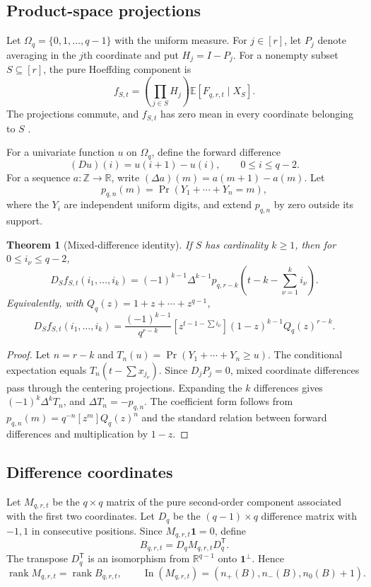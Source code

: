 \documentclass[11pt]{amsart}
\newcommand{\R}{\mathbb R}
\newcommand{\Z}{\mathbb Z}
\newcommand{\In}{\operatorname{In}}
\newcommand{\rank}{\operatorname{rank}}
\newcommand{\1}{\mathbf 1}
\newtheorem{theorem}{Theorem}[section]
\theoremstyle{remark}
\begin{document}
\subsection{Product-space projections}
Let $\Omega_q=\{0,1,\ldots,q-1\}$ with the uniform measure. For $j\in[r]$, let $P_j$ denote averaging in the $j$th coordinate and put $H_j=I-P_j$. For a nonempty subset $S\subseteq[r]$, the pure Hoeffding component is
\[
 f_{S,t}=\left(\prod_{j\in S}H_j\right)\mathbb E[F_{q,r,t}\mid X_S].
\]
The projections commute, and $f_{S,t}$ has zero mean in every coordinate belonging to $S$ \cite{Hoeffding}.

For a univariate function $u$ on $\Omega_q$, define the forward difference
\[
 (Du)(i)=u(i+1)-u(i),\qquad 0\le i\le q-2.
\]
For a sequence $a:\Z\to\R$, write $(\Delta a)(m)=a(m+1)-a(m)$. Let
\[
 p_{q,n}(m)=\Pr(Y_1+\cdots+Y_n=m),
\]
where the $Y_i$ are independent uniform digits, and extend $p_{q,n}$ by zero outside its support.

\begin{theorem}[Mixed-difference identity]\label{thm:mixed-difference}
If $S$ has cardinality $k\ge1$, then for $0\le i_\nu\le q-2$,
\[
 D_Sf_{S,t}(i_1,\ldots,i_k)
 =(-1)^{k-1}\Delta^{k-1}p_{q,r-k}
 \left(t-k-\sum_{\nu=1}^ki_\nu\right).
\]
Equivalently, with $Q_q(z)=1+z+\cdots+z^{q-1}$,
\[
 D_Sf_{S,t}(i_1,\ldots,i_k)
 =\frac{(-1)^{k-1}}{q^{r-k}}
 [z^{t-1-\sum i_\nu}](1-z)^{k-1}Q_q(z)^{r-k}.
\]
\end{theorem}

\begin{proof}
Let $n=r-k$ and $T_n(u)=\Pr(Y_1+\cdots+Y_n\ge u)$. The conditional expectation equals $T_n(t-\sum x_{j_\nu})$. Since $D_jP_j=0$, mixed coordinate differences pass through the centering projections. Expanding the $k$ differences gives $(-1)^k\Delta^kT_n$, and $\Delta T_n=-p_{q,n}$. The coefficient form follows from $p_{q,n}(m)=q^{-n}[z^m]Q_q(z)^n$ and the standard relation between forward differences and multiplication by $1-z$.
\end{proof}

\subsection{Difference coordinates}
Let $M_{q,r,t}$ be the $q\times q$ matrix of the pure second-order component associated with the first two coordinates. Let $D_q$ be the $(q-1)\times q$ difference matrix with $-1,1$ in consecutive positions. Since $M_{q,r,t}\1=0$, define
\[
 B_{q,r,t}=D_qM_{q,r,t}D_q^{\mathsf T}.
\]
The transpose $D_q^{\mathsf T}$ is an isomorphism from $\R^{q-1}$ onto $\1^\perp$. Hence
\begin{equation}\label{eq:inertia-transfer}
 \rank M_{q,r,t}=\rank B_{q,r,t},\qquad
 \In(M_{q,r,t})=(n_+(B),n_-(B),n_0(B)+1).
\end{equation}
\end{document}
